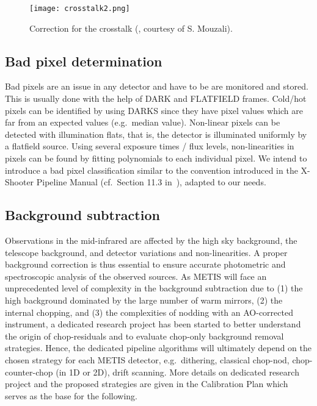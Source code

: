 \begin{figure}[ht]
  \centering
  \texttt{[image: crosstalk2.png]}
  \caption[Detector crosstalk correction]{Correction for the crosstalk
    (\cite{matisse_minutes}, courtesy of S. Mouzali).}
  \label{fig:crosstalk2}
\end{figure}



\subsection{Bad pixel determination}\label{ssec:criticalbadpixeldetermination}

Bad pixels are an issue in any detector and have to be are monitored and stored.
This is usually done with the help of DARK and FLATFIELD frames.
Cold/hot pixels can be identified by using DARKS since they have pixel values which are far from an expected values (e.g.\ median value).
Non-linear pixels can be detected with illumination flats, that is, the detector is illuminated uniformly by a flatfield source.
Using  several exposure times / flux levels, non-linearities in pixels can be found by fitting polynomials to each  individual pixel.
We intend to introduce a bad pixel classification similar to the convention introduced in the X-Shooter Pipeline Manual (cf.\ Section 11.3 in~\cite{xshooter_manual}), adapted to our needs.


\subsection{Background subtraction}\label{ssec:criticalbackgroundsubtraction}
Observations in the mid-infrared are affected by the high sky background, the telescope background, and detector variations and non-linearities.
A proper background correction is thus essential to ensure accurate photometric and spectroscopic analysis of the observed sources.
As METIS will face an unprecedented level of complexity in the background subtraction due to (1) the high background dominated by the large number of warm mirrors, (2) the internal chopping, and (3) the complexities of nodding with an AO-corrected instrument, a dedicated research project has been started to better understand the origin of chop-residuals and to evaluate chop-only background removal strategies.
Hence, the dedicated pipeline algorithms will ultimately depend on the chosen strategy for each METIS detector, e.g.\ dithering, classical chop-nod, chop-counter-chop (in 1D or 2D), drift scanning.
More details on dedicated research project and the proposed strategies are given in the Calibration Plan \cite{METIS-calibration_plan} which serves as the base for the following.

